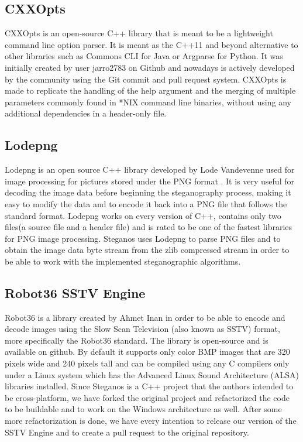 \subsection{CXXOpts}
CXXOpts is an open-source C++ library that is meant to be a lightweight command line option parser\cite{jarro2783_2020}. It is meant as the C++11 and beyond alternative to other libraries such as Commons CLI for Java or Argparse for Python. It was initially created by user jarro2783 on Github and nowadays is actively developed by the community using the Git commit and pull request system. CXXOpts is made to replicate the handling of the help argument and the merging of multiple parameters commonly found in *NIX command line binaries, without using any additional dependencies in a header-only file.


\subsection{Lodepng}
Lodepng is an open source C++ library developed by Lode Vandevenne used for image processing for pictures stored under the PNG format \cite{lvandeve_2020}. It is very useful for decoding the image data before beginning the steganography process, making it easy to modify the data and to encode it back into a PNG file that follows the standard format. Lodepng works on every version of C++, contains only two files(a source file and a header file) and is rated to be one of the fastest libraries for PNG image processing. Steganos uses Lodepng to parse PNG files and to obtain the image data byte stream from the zlib compressed stream in order to be able to work with the implemented steganographic algorithms.

\subsection{Robot36 SSTV Engine}
Robot36 is a library created by Ahmet Inan in order to be able to encode and decode images using the Slow Scan Television (also known as SSTV) format, more specifically the Robot36 standard. The library is open-source and is available on github\cite{robot36_git}. By default it supports only color BMP images that are 320 pixels wide and 240 pixels tall and can be compiled using any C compilers only under a Linux system which has the Advanced Linux Sound Architecture (ALSA) libraries installed. Since Steganos is a C++ project that the authors intended to be cross-platform, we have forked the original project and refactorized the code to be buildable and to work on the Windows architecture as well. After some more refactorization is done, we have every intention to release our version of the SSTV Engine and to create a pull request to the original repository.

